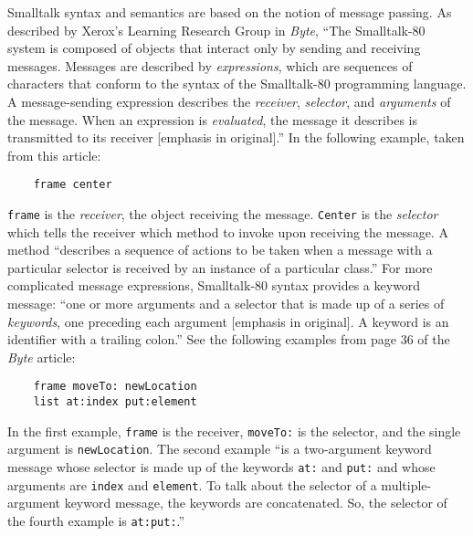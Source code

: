\documentclass[acmsmall]{acmart}\settopmatter{}
\begin{document}
Smalltalk syntax and semantics are based on the notion of message passing. As described by Xerox's Learning Research Group in \emph{Byte}, ``The Smalltalk-80 system is composed of objects that interact only by sending and receiving messages.\textellipsis{} Messages are described by \textit{expressions}, which are sequences of characters that conform to the syntax of the Smalltalk-80 programming language. A message-sending expression describes the \textit{receiver}, \textit{selector}, and \textit{arguments} of the message. When an expression is \textit{evaluated}, the message it describes is transmitted to its receiver [emphasis in original].'' \citep[36]{xerox_learning_research_group_smalltalk-80_1981} In the following example, taken from this article:
\begin{verbatim}
    frame center
\end{verbatim}
\verb|frame| is the \textit{receiver}, the object receiving the message. \verb|Center| is the \textit{selector} which tells the receiver which method to invoke upon receiving the message. A method ``describes a sequence of actions to be taken when a message with a particular selector is received by an instance of a particular class.''  \citep[39]{xerox_learning_research_group_smalltalk-80_1981} For more complicated message expressions, Smalltalk-80 syntax provides a keyword message: ``\textellipsis{}one or more arguments and a selector that is made up of a series of \emph{keywords}, one preceding each argument [emphasis in original]. A keyword is an identifier with a trailing colon.''  \citep[36--37]{xerox_learning_research_group_smalltalk-80_1981} See the following examples from page 36 of the \emph{Byte} article:
\begin{verbatim}
    frame moveTo: newLocation
    list at:index put:element
\end{verbatim}
In the first example, \verb|frame| is the receiver, \verb|moveTo:| is the selector, and the single argument is \verb|newLocation|. The second example ``is a two-argument keyword message whose selector is made up of the keywords \verb|at:| and \verb|put:| and whose arguments are \verb|index| and \verb|element|. To talk about the selector of a multiple-argument keyword message, the keywords are concatenated. So, the selector of the fourth example is \verb|at:put:|.'' \citep[37]{xerox_learning_research_group_smalltalk-80_1981}
\end{document}
